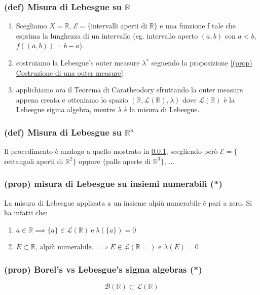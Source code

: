 \subsubsection{(def) Misura di Lebesgue su $\mathbb R$}\label{(def) Misura di Lebesgues R}
\begin{enumerate}
    \item Scegliamo $X=\mathbb{R}$, $\mathcal E=\{$intervalli aperti di $\mathbb R\}$ e una funzione f tale che esprima la lunghezza di un intervallo (eg. intervallo aperto $(a,b)$ con $a<b$, $f((a,b))=b-a$).
    \item costruiamo la Lebesgue's outer measure $\lambda^*$ seguendo la proposizione \ref{(prop) Costruzione di una outer measure} 
    \item applichiamo ora il Teorema di Caratheodory sfruttando la outer measure appena creata e otteniamo lo spazio $(\mathbb R, \mathcal L(\mathbb R),\lambda)$ dove $\mathcal L(\mathbb R)$ è la Lebesgue sigma algebra, mentre $\lambda$ è la misura di Lebesgue.
\end{enumerate}
\subsubsection{(def) Misura di Lebesgue su $\mathbb R^n$}
Il procedimento è analogo a quello mostrato in \ref{(def) Misura di Lebesgues R}, scegliendo però $\mathcal E=\{$ rettangoli aperti di $\mathbb R^2\}$ oppure $\{$palle aperte di $\mathbb R^3\}$, ...
\subsubsection{(prop) misura di Lebesgue su insiemi numerabili (*)}
La misura di Lebesgue applicata a un insieme alpiù numerabile è pari a zero.
Si ha infatti che:
\begin{enumerate}
    \item $a\in \mathbb R \implies \{a\}\in\mathcal L(\mathbb R) \ \text{e} \ \lambda(\{a\})=0$
    \item $E\subset \mathbb R$, alpiù numerabile. $\implies E\in \mathcal L(\mathbb R=)$ e $\lambda(E)=0$
\end{enumerate}
\subsubsection{(prop) Borel's vs Lebesgue's sigma algebras (*)}
$$\mathcal B(\mathbb R)\subset \mathcal L(\mathbb R)$$
